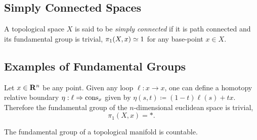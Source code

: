 \subsection{Simply Connected Spaces}

\begin{definition}
\label{def:simply-connected}
A topological space \(X\) is said to be \emph{simply connected} if it is path
connected and its fundamental group is
trivial, \(\pi_1(X, x) \simeq 1\) for any base-point \(x \in X\).
\end{definition}


\subsection{Examples of Fundamental Groups}

\begin{example}
\label{exp:euclidean-space-pi1-is-trivial}
Let \(x \in \mathbf{R}^n\) be any point. Given any loop \(\ell: x \to x\), one can
define a homotopy relative boundary \(\eta: \ell \Rightarrow \operatorname{cons}_x\) given by
\(\eta(s, t) \coloneq (1 - t) \ell(s) + t x\). Therefore the fundamental group
of the \(n\)-dimensional euclidean space is trivial,
\[
\pi_1(X, x) = *.
\]
\end{example}

\begin{proposition}
\label{prop:pi1-manifold-is-countable}
The fundamental group of a topological manifold is countable.
\end{proposition}

